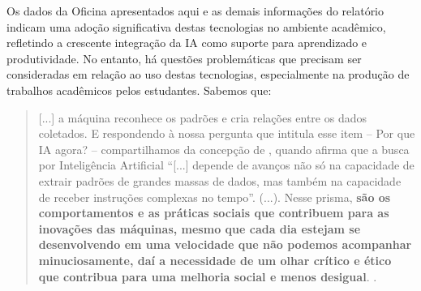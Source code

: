 \documentclass[portuguese]{textolivre}
\begin{document}
Os dados da Oficina apresentados aqui e as demais informações do relatório \textcite{digital2024} indicam uma adoção significativa destas tecnologias no ambiente acadêmico, refletindo a crescente integração da IA como suporte para aprendizado e produtividade. No entanto, há questões problemáticas que precisam ser consideradas em relação ao uso destas tecnologias, especialmente na produção de trabalhos acadêmicos pelos estudantes. Sabemos que:

\begin{quote}
    [...] a máquina reconhece os padrões e cria relações entre os dados coletados. E respondendo à nossa pergunta que intitula esse item -- Por que IA agora? – compartilhamos da concepção de \textcite[p.6]{Kaufman2022DesmistificandoIA}, quando afirma que a busca por Inteligência Artificial ``[...] depende de avanços não só na capacidade de extrair padrões de grandes massas de dados, mas também na capacidade de receber instruções complexas no tempo''. (...). Nesse prisma, \textbf{são os comportamentos e as práticas sociais que contribuem para as inovações das máquinas, mesmo que cada dia estejam se desenvolvendo em uma velocidade que não podemos acompanhar minuciosamente, daí a necessidade de um olhar crítico e ético que contribua para uma melhoria social e menos desigual}. \cite[p. 4, grifo nosso]{rodrigues2023}.
\end{quote}
\end{document}
